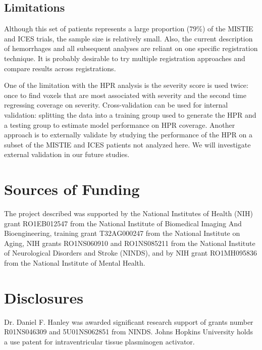 \documentclass[10pt]{article}\usepackage[]{graphicx}\usepackage[]{color}
\begin{document}
\subsection{Limitations}

Although this set of patients represents a large proportion ($79$\%) of the MISTIE and ICES trials, the sample size is relatively small.  Also, the current description of hemorrhages and all subsequent analyses are reliant on one specific registration technique.  It is probably desirable \cite{eloyan_ms} to try multiple registration approaches and compare results across registrations.

One of the limitation with the HPR analysis is the severity score is used twice: once to find voxels that are most associated with severity and the second time regressing coverage on severity. Cross-validation can be used for internal validation: splitting the data into a training group used to generate the HPR and a testing group to estimate model performance on HPR coverage.  Another approach is to externally validate by studying the performance of the HPR on a subset of the MISTIE and ICES patients not analyzed here. We will investigate external validation in our future studies.  




\section{Sources of Funding}
The project described was supported by the National Institutes of Health (NIH) grant RO1EB012547 from the National Institute of Biomedical Imaging And Bioengineering, training grant T32AG000247 from the National Institute on Aging, NIH grants RO1NS060910 and  RO1NS085211 from the National Institute of Neurological Disorders and Stroke (NINDS), and by NIH grant RO1MH095836 from the National Institute of Mental Health. 

\section{Disclosures}
Dr. Daniel F. Hanley was awarded significant research support of grants number R01NS046309 and 5U01NS062851 from NINDS. Johns Hopkins University holds a use patent for intraventricular tissue plasminogen activator.
\end{document}

